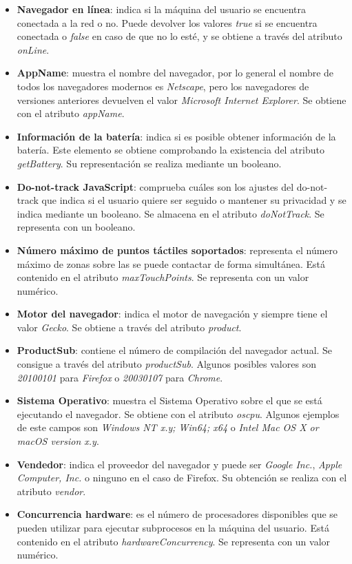 \begin{itemize}
    \item \textbf{Navegador en línea}: indica si la máquina del usuario se encuentra conectada a la red o no. Puede devolver los valores \textit{true} si se encuentra conectada o \textit{false} en caso de que no lo esté, y se obtiene a través del atributo \textit{onLine}.
    \item \textbf{AppName}: muestra el nombre del navegador, por lo general el nombre de todos los navegadores modernos es \textit{Netscape}, pero los navegadores de versiones anteriores devuelven el valor \textit{Microsoft Internet Explorer}. Se obtiene con el atributo \textit{appName}.
    \item \textbf{Información de la batería}: indica si es posible obtener información de la batería. Este elemento se obtiene comprobando la existencia del atributo \textit{getBattery}. Su representación se realiza mediante un booleano.
    \item \textbf{Do-not-track JavaScript}: comprueba cuáles son los ajustes del do-not-track que indica si el usuario quiere ser seguido o mantener su privacidad y se indica mediante un booleano. Se almacena en el atributo \textit{doNotTrack}. Se representa con un booleano.
    \item \textbf{Número máximo de puntos táctiles soportados}: representa el número máximo de zonas sobre las se puede contactar de forma simultánea. Está contenido en el atributo \textit{maxTouchPoints}. Se representa con un valor numérico.
    \item \textbf{Motor del navegador}: indica el motor de navegación y siempre tiene el valor \textit{Gecko}. Se obtiene a través del atributo \textit{product}. 
    \item \textbf{ProductSub}: contiene el número de compilación del navegador actual. Se consigue a través del atributo \textit{productSub}. Algunos posibles valores son \textit{20100101} para \textit{Firefox} o \textit{20030107} para \textit{Chrome}.
    \item \textbf{Sistema Operativo}: muestra el Sistema Operativo sobre el que se está ejecutando el navegador. Se obtiene con el atributo \textit{oscpu}. Algunos ejemplos de este campos son \textit{Windows NT x.y; Win64; x64} o \textit{Intel Mac OS X or macOS version x.y}.
    \item \textbf{Vendedor}: indica el proveedor del navegador y puede ser \textit{Google Inc.}, \textit{Apple Computer, Inc.} o ninguno en el caso de Firefox. Su obtención se realiza con el atributo \textit{vendor}.
    \item \textbf{Concurrencia hardware}: es el número de procesadores disponibles que se pueden utilizar para ejecutar subprocesos en la máquina del usuario. Está contenido en el atributo \textit{hardwareConcurrency}. Se representa con un valor numérico.

\end{itemize}
